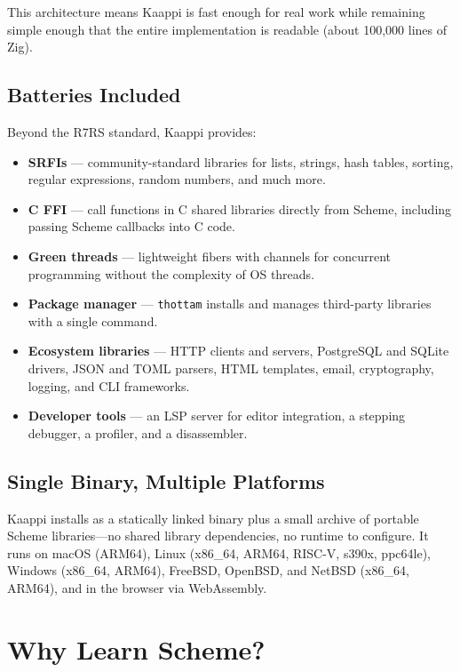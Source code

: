This architecture means Kaappi is fast enough for real work while remaining simple enough that the entire implementation is readable (about 100,000 lines of Zig).

\subsection{Batteries Included}

Beyond the R7RS standard, Kaappi provides:

\begin{itemize}
    \item \textbf{\srfitotal{} SRFIs} --- community-standard libraries for lists, strings, hash tables, sorting, regular expressions, random numbers, and much more.
    \item \textbf{C FFI} --- call functions in C shared libraries directly from Scheme, including passing Scheme callbacks into C code.
    \item \textbf{Green threads} --- lightweight fibers with channels for concurrent programming without the complexity of OS threads.
    \item \textbf{Package manager} --- \texttt{thottam} installs and manages third-party libraries with a single command.
    \item \textbf{Ecosystem libraries} --- HTTP clients and servers, PostgreSQL and SQLite drivers, JSON and TOML parsers, HTML templates, email, cryptography, logging, and CLI frameworks.
    \item \textbf{Developer tools} --- an LSP server for editor integration, a stepping debugger, a profiler, and a disassembler.
\end{itemize}

\subsection{Single Binary, Multiple Platforms}

Kaappi installs as a statically linked binary plus a small archive of portable Scheme libraries---no shared library dependencies, no runtime to configure. It runs on macOS (ARM64), Linux (x86\_64, ARM64, RISC-V, s390x, ppc64le), Windows (x86\_64, ARM64), FreeBSD, OpenBSD, and NetBSD (x86\_64, ARM64), and in the browser via WebAssembly.

\section{Why Learn Scheme?}

